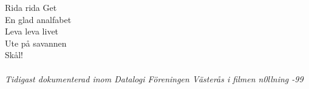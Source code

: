 \vspace{10pt}
Rida rida Get\\
En glad analfabet\\
Leva leva livet\\
Ute på savannen\\
Skål!\\
\\
{\footnotesize\textit{Tidigast dokumenterad inom Datalogi Föreningen Västerås i filmen n0llning -99}}
